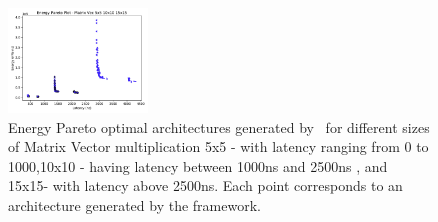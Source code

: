 \begin{figure}[!h]
\centering
\includegraphics[width=0.33\textwidth]{graphs/EnergyParetoPlotMultipleSizeMAtrixVec.pdf}
    \caption{\small Energy Pareto optimal architectures generated by \frameworkname ~for different sizes of Matrix Vector multiplication 5x5 - with latency ranging from 0 to 1000,10x10 - having latency between 1000ns and 2500ns , and 15x15- with latency above 2500ns. Each point corresponds to an architecture generated by the framework.}
\label{fig:sram_vs_mram_pareto_vec_sizes}
\end{figure}
